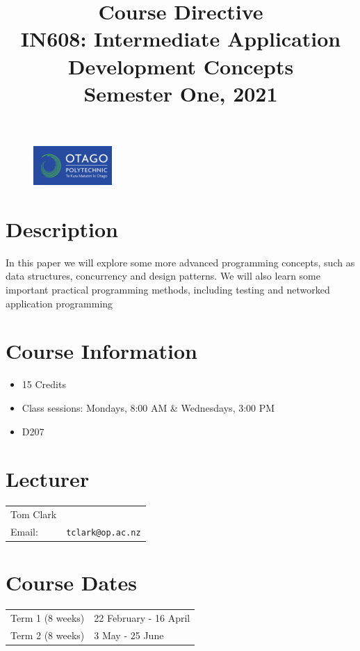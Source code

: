 \documentclass{article}
\begin{document}
\begin{figure}
\includegraphics[width=30mm]{oplogo.png}
\end{figure}

\title{Course Directive\\IN608: Intermediate Application Development Concepts \\Semester One, 2021}
\date{}
\maketitle

\section*{Description}
In this paper we will explore some more advanced programming concepts, such as data structures, concurrency and 
design patterns.  We will also learn some important practical programming methods, including testing and networked
application programming



\section*{Course Information}
\begin{itemize}
  \item 15 Credits
  \item Class sessions: Mondays, 8:00 AM \& Wednesdays, 3:00 PM
  \item D207
\end{itemize}

\section*{Lecturer}
\begin{tabular}{lr}

  Tom Clark &    \\
     Email: & \texttt{tclark@op.ac.nz} \\
        
\end{tabular}

\section*{Course Dates}
\begin{tabular}{ll}
Term 1 (8 weeks) & 22 February - 16 April\\
Term 2 (8 weeks) & 3 May - 25 June\\
\end{tabular}
\end{document}
